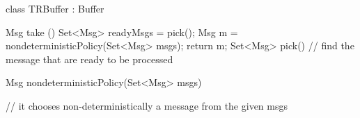 class TRBuffer : Buffer {

    Msg take ()
    {
        Set<Msg> readyMsgs = pick();
        Msg m = nondeterministicPolicy(Set<Msg> msgs);
        return m;
    }
    Set<Msg> pick() {
        // find the message that are ready to be processed
    }
    
     Msg nondeterministicPolicy(Set<Msg> msgs)
    {
        // it chooses non-deterministically a message from the given msgs

    }

}